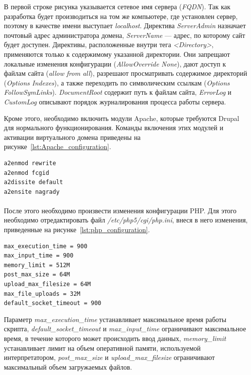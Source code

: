В первой строке рисунка указывается сетевое имя сервера (\textit{FQDN}). 
Так как разработка будет производиться на том же компьютере, 
где установлен сервер, поэтому в качестве имени выступает \textit{localhost}.
Директива \textit{ServerAdmin} назначает почтовый адрес администратора домена, 
\textit{ServerName} --- адрес, по которому сайт будет доступен.
Директивы, расположенные внутри тега \textit{<Directory>}, применяются только
к содержимому указанной директории.
Они запрещают локальные изменения конфигурации (\textit{AllowOverride None}),
дают доступ к файлам сайта (\textit{allow from all}),
разрешают просматривать содержимое директорий (\textit{Options Indexes}),
а также переходить по символическим ссылкам (\textit{Options FollowSymLinks}).
\textit{DocumentRoot} содержит путь к файлам сайта,
\textit{ErrorLog} и \textit{CustomLog} описывают порядок журналирования
процесса работы сервера.

Кроме этого, необходимо включить модули Apache, которые требуются Drupal для 
нормального функционирования. Команды включения этих модулей и активации 
виртуального домена приведены на рисунке~\ref{lst:Apache_configuration}.

\begin{lstlisting}[language=bash,
  caption=Команды включения дополнительных модулей
  Apache и активации виртуального домена,
  label=lst:Apache_configuration]
a2enmod rewrite
a2enmod fcgid
a2dissite default
a2ensite nagrady
\end{lstlisting}

\paragraph{}
После этого необходимо произвести изменения конфигурации PHP.
Для этого необходимо отредактировать файл \textit{/etc/php5/cgi/php.ini},
внеся в него изменения, приведенные на рисунке~\ref{lst:php_configuration}.

\begin{lstlisting}[language=bash,
  caption=Измененные параметры файла php.ini,
  label=lst:php_configuration]
max_execution_time = 900
max_input_time = 900
memory_limit = 512M
post_max_size = 64M
upload_max_filesize = 64M
max_file_uploads = 32M
default_socket_timeout = 900
\end{lstlisting}

Параметр \textit{max\_execution\_time} устанавливает максимальное 
время работы скрипта,
\textit{default\_socket\_timeout} и \textit{max\_input\_time} ограничивают
максимальное время, в течение которого может происходить ввод данных,  
\textit{memory\_limit} устанавливает лимит на объем оперативной памяти,
используемой интерпретатором,
\textit{post\_max\_size} и \textit{upload\_max\_filesize} ограничивают
максимальный объем загружаемых файлов.

